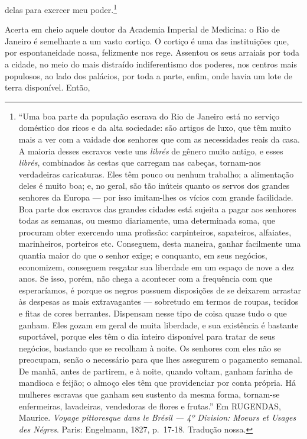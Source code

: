 delas para exercer meu poder.\footnote{``Uma boa parte da população
  escrava do Rio de Janeiro está no serviço doméstico dos ricos e da
  alta sociedade: são artigos de luxo, que têm muito mais a ver com a
  vaidade dos senhores que com as necessidades reais da casa. A maioria
  desses escravos veste uns \textit{librés} de gênero muito antigo, e
  esses \textit{librés}, combinados às cestas que carregam nas cabeças,
  tornam-nos verdadeiras caricaturas. Eles têm pouco ou nenhum trabalho;
  a alimentação deles é muito boa; e, no geral, são tão inúteis quanto
  os servos dos grandes senhores da Europa --- por isso imitam-lhes os
  vícios com grande facilidade. Boa parte dos escravos das grandes
  cidades está sujeita a pagar aos senhores todas as semanas, ou mesmo
  diariamente, uma determinada soma, que procuram obter exercendo uma
  profissão: carpinteiros, sapateiros, alfaiates, marinheiros, porteiros
  etc. Conseguem, desta maneira, ganhar facilmente uma quantia maior do
  que o senhor exige; e conquanto, em seus negócios, economizem,
  conseguem resgatar sua liberdade em um espaço de nove a dez anos. Se
  isso, porém, não chega a acontecer com a frequência com que
  esperaríamos, é porque os negros possuem disposições de se deixarem
  arrastar às despesas as mais extravagantes --- sobretudo em termos de
  roupas, tecidos e fitas de cores berrantes. Dispensam nesse tipo de
  coisa quase tudo o que ganham. Eles gozam em geral de muita liberdade,
  e sua existência é bastante suportável, porque eles têm o dia inteiro
  disponível para tratar de seus negócios, bastando que se recolham à
  noite. Os senhores com eles não se preocupam, senão o necessário para
  que lhes assegurem o pagamento semanal. De manhã, antes de partirem, e
  à noite, quando voltam, ganham farinha de mandioca e feijão; o almoço
  eles têm que providenciar por conta própria. Há mulheres escravas que
  ganham seu sustento da mesma forma, tornam-se enfermeiras, lavadeiras,
  vendedoras de flores e frutas.'' Em RUGENDAS, Maurice. \textit{Voyage
  pittoresque dans le Brésil --- 4º Division: Moeurs et Usages des
  Négres}. Paris: Engelmann, 1827, p.~17-18. Tradução nossa.}

Acerta em cheio aquele doutor da Academia Imperial de Medicina: o Rio de
Janeiro é semelhante a um vasto cortiço. O cortiço é uma das
instituições que, por espontaneidade nossa, felizmente nos rege.
Assentou os seus arraiais por toda a cidade, no meio do mais distraído
indiferentismo dos poderes, nos centros mais populosos, ao lado dos
palácios, por toda a parte, enfim, onde havia um lote de terra
disponível. Então,

